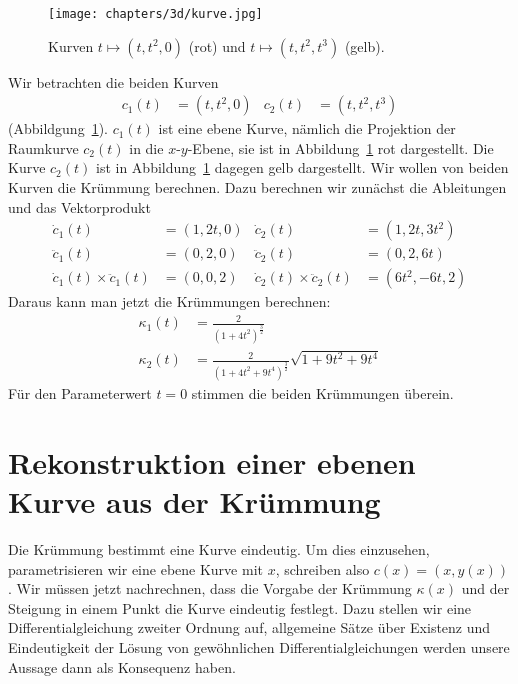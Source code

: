 \begin{beispiel}
\begin{figure}
\centering
\texttt{[image: chapters/3d/kurve.jpg]}
\caption{Kurven $t\mapsto(t,t^2,0)$ (rot) und $t\mapsto(t,t^2,t^3)$ (gelb).
\label{skript:kruemmung:fig:kurvekr}}
\end{figure}
Wir betrachten die beiden Kurven
\begin{align*}
c_1(t)&=(t,t^2,0)
&
c_2(t)&=(t,t^2,t^3)
\end{align*}
(Abbildgung~\ref{skript:kruemmung:fig:kurvekr}).
$c_1(t)$ ist eine ebene Kurve, nämlich die Projektion der Raumkurve
$c_2(t)$ in die $x$-$y$-Ebene, sie ist in
Abbildung~\ref{skript:kruemmung:fig:kurvekr} rot dargestellt.
Die Kurve $c_2(t)$ ist in Abbildung~\ref{skript:kruemmung:fig:kurvekr} 
dagegen gelb dargestellt.
Wir wollen von beiden Kurven die Krümmung berechnen.
Dazu berechnen wir zunächst die Ableitungen und das Vektorprodukt
\begin{align*}
\dot c_1(t)
&=
(1,2t,0)
&
\dot c_2(t)
&=
(1,2t,3t^2)
\\
\ddot c_1(t)
&=
(0,2,0)
&
\ddot c_2(t)
&=
(0, 2, 6t)
\\
\dot c_1(t)\times \ddot c_1(t)
&=
(0,0,2)
&
\dot c_2(t)\times \ddot c_2(t)
&=
(6t^2,-6t,2)
\end{align*}
Daraus kann man jetzt die Krümmungen berechnen:
\begin{align*}
\kappa_1(t)
&=
\frac{2}{(1+4t^2)^{\frac32}}
\\
\kappa_2(t)
&=
\frac{2}{(1+4t^2 + 9t^4)^{\frac32}}
\sqrt{1+9t^2+9t^4}
\end{align*}
Für den Parameterwert $t=0$ stimmen die beiden Krümmungen überein.
\end{beispiel}

\section{Rekonstruktion einer ebenen Kurve aus der Krümmung}
Die Krümmung bestimmt eine Kurve eindeutig.
Um dies einzusehen, parametrisieren wir eine ebene Kurve mit
$x$, schreiben also $c(x)=(x,y(x))$.
Wir müssen jetzt nachrechnen, dass die Vorgabe der Krümmung $\kappa(x)$
und der Steigung in einem Punkt die Kurve eindeutig festlegt.
Dazu stellen wir eine Differentialgleichung zweiter Ordnung auf,
allgemeine Sätze über Existenz und Eindeutigkeit der Lösung von
gewöhnlichen Differentialgleichungen werden unsere Aussage dann
als Konsequenz haben.

